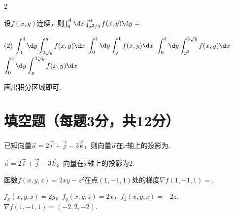 \begin{paracol}{2}
\begin{problem}
    设$f(x,y)$连续，则$\int_0^4\d x\int_{x^2/4}^xf(x,y)\d y=$
    \begin{tasks}(2)
        \task $\displaystyle\int_0^4\d y\int_{2\sqrt y}^yf(x,y)\d x$
        \task $\displaystyle\int_0^4\d y\int_y^1f(x,y)\d x$
        \task $\displaystyle\int_0^4\d y\int_{y^2}^{2\sqrt y}f(x,y)\d x$
        \task[\true] $\displaystyle\int_0^4\d y\int_y^{2\sqrt y}f(x,y)\d x$
    \end{tasks}
\end{problem}
\switchcolumn
{}
\begin{solution}
    画出积分区域即可.
    \begin{figure}[htbp]
        \everymath{\scriptstyle}
        \centering
    \end{figure}
\end{solution}
\end{paracol}

\section{填空题（每题3分，共12分）}

\begin{problem}
    已知向量$\vec a=2\vec i+\vec j-3\vec k$，则向量$\vec a$在$x$轴上的投影为.
\end{problem}
\begin{solution}
    $\vec a=2\vec i+\vec j-3\vec k$，向量在$x$轴上的投影为$2$.
\end{solution}

\begin{problem}
    函数$f(x,y,z)=2xy-z^2$在点$(1,-1,1)$处的梯度$\nabla f(1,-1,1)=$.
\end{problem}
\begin{solution}
    $f_x(x,y,z)=2y$，$f_y(x,y,z)=2x$，$f_z(x,y,z)=-2z$. $\nabla f(1,-1,1)=(-2,2,-2)$.
\end{solution}

